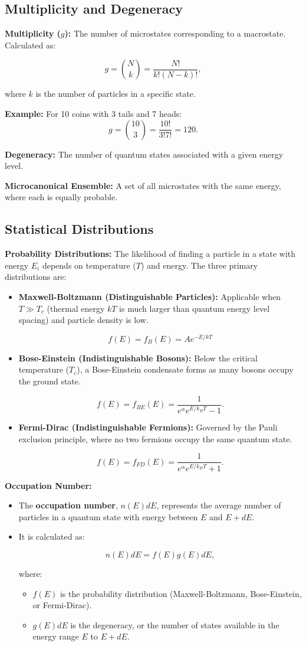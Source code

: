 \documentclass{article}
\newcommand{\eqbox}[1]{\begin{tcolorbox}[colback=gray!10] #1 \end{tcolorbox}}
\newcommand{\conceptbox}[1]{\begin{tcolorbox}[colback=blue!10] #1 \end{tcolorbox}}
\begin{document}
\subsection{Multiplicity and Degeneracy}
\conceptbox{
\textbf{Multiplicity (\( g \)):} 
The number of microstates corresponding to a macrostate. Calculated as:
\eqbox{
\[
g = \binom{N}{k} = \frac{N!}{k!(N-k)!},
\]
}
where \( k \) is the number of particles in a specific state.

\textbf{Example:}
For 10 coins with 3 tails and 7 heads:
\[
g = \binom{10}{3} = \frac{10!}{3!7!} = 120.
\]

\textbf{Degeneracy:} 
The number of quantum states associated with a given energy level.

\textbf{Microcanonical Ensemble:} 
A set of all microstates with the same energy, where each is equally probable.
}

\subsection{Statistical Distributions}
\conceptbox{
\textbf{Probability Distributions:}
The likelihood of finding a particle in a state with energy \( E_i \) depends on temperature (\( T \)) and energy. The three primary distributions are:

\begin{itemize}
    \item \textbf{Maxwell-Boltzmann (Distinguishable Particles):}
    Applicable when \( T \gg T_c \) (thermal energy \( kT \) is much larger than quantum energy level spacing) and particle density is low.
    \eqbox{
    \[
    f(E) = f_B(E) = Ae^{-E/kT}
    \]
    }
    \item \textbf{Bose-Einstein (Indistinguishable Bosons):}
    Below the critical temperature (\( T_c \)), a Bose-Einstein condensate forms as many bosons occupy the ground state.
    \eqbox{
    \[
    f(E) = f_{BE}(E) = \frac{1}{e^\alpha e^{E / k_BT} - 1}.
    \]
    }
    \item \textbf{Fermi-Dirac (Indistinguishable Fermions):}
    Governed by the Pauli exclusion principle, where no two fermions occupy the same quantum state.
    \eqbox{
    \[
    f(E) = f_{FD}(E) = \frac{1}{e^\alpha e^{E / k_BT} + 1}.
    \]
    }
\end{itemize}
}
\conceptbox{
\textbf{Occupation Number:}
\begin{itemize}
    \item The \textbf{occupation number}, \( n(E)dE \), represents the average number of particles in a quantum state with energy between \( E \) and \( E + dE \).
    \item It is calculated as:
    \eqbox{
    \[
    n(E)dE = f(E)g(E)dE,
    \]
    }
    where:
    \begin{itemize}
        \item \( f(E) \) is the probability distribution (Maxwell-Boltzmann, Bose-Einstein, or Fermi-Dirac).
        \item \( g(E)dE \) is the degeneracy, or the number of states available in the energy range \( E \) to \( E + dE \).
    \end{itemize}
\end{itemize}
}
\end{document}
